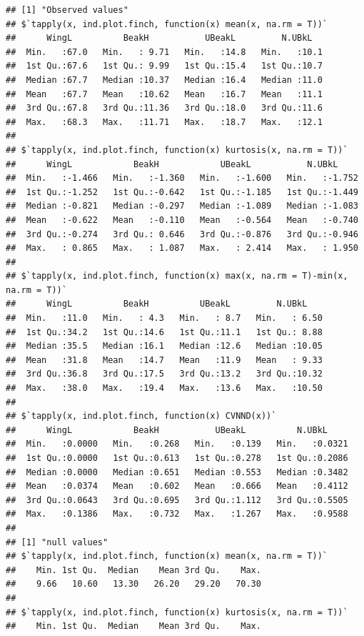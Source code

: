 \documentclass[12pt]{article}\usepackage[]{graphicx}\usepackage[]{color}
\makeatletter
\newenvironment{kframe}{%
 \def\at@end@of@kframe{}%
 \ifinner\ifhmode%
  \def\at@end@of@kframe{\end{minipage}}%
  \begin{minipage}{\columnwidth}%
 \fi\fi%
 \def\FrameCommand##1{\hskip\@totalleftmargin \hskip-\fboxsep
 \colorbox{shadecolor}{##1}\hskip-\fboxsep
     \hskip-\linewidth \hskip-\@totalleftmargin \hskip\columnwidth}%
 \MakeFramed {\advance\hsize-\width
   \@totalleftmargin\z@ \linewidth\hsize
   \@setminipage}}%
 {\par\unskip\endMakeFramed%
 \at@end@of@kframe}
\newenvironment{knitrout}{}{} %
\makeatother
\begin{document}
\begin{knitrout}
\begin{kframe}
\begin{alltt}
\end{alltt}
\begin{verbatim}
## [1] "Observed values"
## $`tapply(x, ind.plot.finch, function(x) mean(x, na.rm = T))`
##      WingL          BeakH           UBeakL         N.UBkL    
##  Min.   :67.0   Min.   : 9.71   Min.   :14.8   Min.   :10.1  
##  1st Qu.:67.6   1st Qu.: 9.99   1st Qu.:15.4   1st Qu.:10.7  
##  Median :67.7   Median :10.37   Median :16.4   Median :11.0  
##  Mean   :67.7   Mean   :10.62   Mean   :16.7   Mean   :11.1  
##  3rd Qu.:67.8   3rd Qu.:11.36   3rd Qu.:18.0   3rd Qu.:11.6  
##  Max.   :68.3   Max.   :11.71   Max.   :18.7   Max.   :12.1  
## 
## $`tapply(x, ind.plot.finch, function(x) kurtosis(x, na.rm = T))`
##      WingL            BeakH            UBeakL           N.UBkL      
##  Min.   :-1.466   Min.   :-1.360   Min.   :-1.600   Min.   :-1.752  
##  1st Qu.:-1.252   1st Qu.:-0.642   1st Qu.:-1.185   1st Qu.:-1.449  
##  Median :-0.821   Median :-0.297   Median :-1.089   Median :-1.083  
##  Mean   :-0.622   Mean   :-0.110   Mean   :-0.564   Mean   :-0.740  
##  3rd Qu.:-0.274   3rd Qu.: 0.646   3rd Qu.:-0.876   3rd Qu.:-0.946  
##  Max.   : 0.865   Max.   : 1.087   Max.   : 2.414   Max.   : 1.950  
## 
## $`tapply(x, ind.plot.finch, function(x) max(x, na.rm = T)-min(x, na.rm = T))`
##      WingL          BeakH          UBeakL         N.UBkL     
##  Min.   :11.0   Min.   : 4.3   Min.   : 8.7   Min.   : 6.50  
##  1st Qu.:34.2   1st Qu.:14.6   1st Qu.:11.1   1st Qu.: 8.88  
##  Median :35.5   Median :16.1   Median :12.6   Median :10.05  
##  Mean   :31.8   Mean   :14.7   Mean   :11.9   Mean   : 9.33  
##  3rd Qu.:36.8   3rd Qu.:17.5   3rd Qu.:13.2   3rd Qu.:10.32  
##  Max.   :38.0   Max.   :19.4   Max.   :13.6   Max.   :10.50  
## 
## $`tapply(x, ind.plot.finch, function(x) CVNND(x))`
##      WingL            BeakH           UBeakL          N.UBkL      
##  Min.   :0.0000   Min.   :0.268   Min.   :0.139   Min.   :0.0321  
##  1st Qu.:0.0000   1st Qu.:0.613   1st Qu.:0.278   1st Qu.:0.2086  
##  Median :0.0000   Median :0.651   Median :0.553   Median :0.3482  
##  Mean   :0.0374   Mean   :0.602   Mean   :0.666   Mean   :0.4112  
##  3rd Qu.:0.0643   3rd Qu.:0.695   3rd Qu.:1.112   3rd Qu.:0.5505  
##  Max.   :0.1386   Max.   :0.732   Max.   :1.267   Max.   :0.9588  
## 
## [1] "null values"
## $`tapply(x, ind.plot.finch, function(x) mean(x, na.rm = T))`
##    Min. 1st Qu.  Median    Mean 3rd Qu.    Max. 
##    9.66   10.60   13.30   26.20   29.20   70.30 
## 
## $`tapply(x, ind.plot.finch, function(x) kurtosis(x, na.rm = T))`
##    Min. 1st Qu.  Median    Mean 3rd Qu.    Max. 

\end{verbatim}
\end{kframe}
\end{knitrout}
\end{document}
